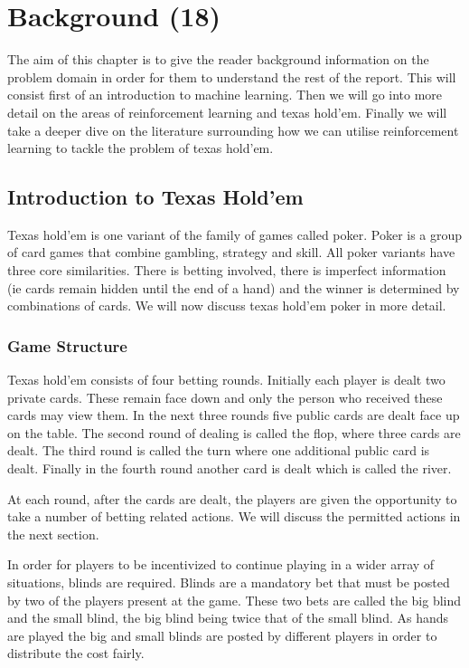 \chapter{Background (18)}
\label{ch:background}

The aim of this chapter is to give the reader background information on the problem domain in order for them
to understand the rest of the report.
This will consist first of an introduction to machine learning.
Then we will go into more detail on the areas of reinforcement learning and texas hold'em.
Finally we will take a deeper dive on the literature surrounding how we can utilise reinforcement learning
to tackle the problem of texas hold'em.

\section{Introduction to Texas Hold'em}\label{sec:thIntro}
Texas hold'em is one variant of the family of games called poker.
Poker is a group of card games that combine gambling, strategy and skill.
All poker variants have three core similarities.
There is betting involved, there is imperfect information (ie cards remain hidden until the end of a hand)
and the winner is determined by combinations of cards.
We will now discuss texas hold'em poker in more detail.

\subsection{Game Structure}\label{subsec:bettingRounds}
Texas hold'em consists of four betting rounds.
Initially each player is dealt two private cards.
These remain face down and only the person who received these cards may view them.
In the next three rounds five public cards are dealt face up on the table.
The second round of dealing is called the flop, where three cards are dealt.
The third round is called the turn where one additional public card is dealt.
Finally in the fourth round another card is dealt which is called the river.

At each round, after the cards are dealt, the players are given the opportunity to take a number of betting related actions.
We will discuss the permitted actions in the next section.

In order for players to be incentivized to continue playing in a wider array of situations, blinds are required.
Blinds are a mandatory bet that must be posted by two of the players present at the game.
These two bets are called the big blind and the small blind, the big blind being twice that of the small blind.
As hands are played the big and small blinds are posted by different players in order to distribute the cost fairly.

